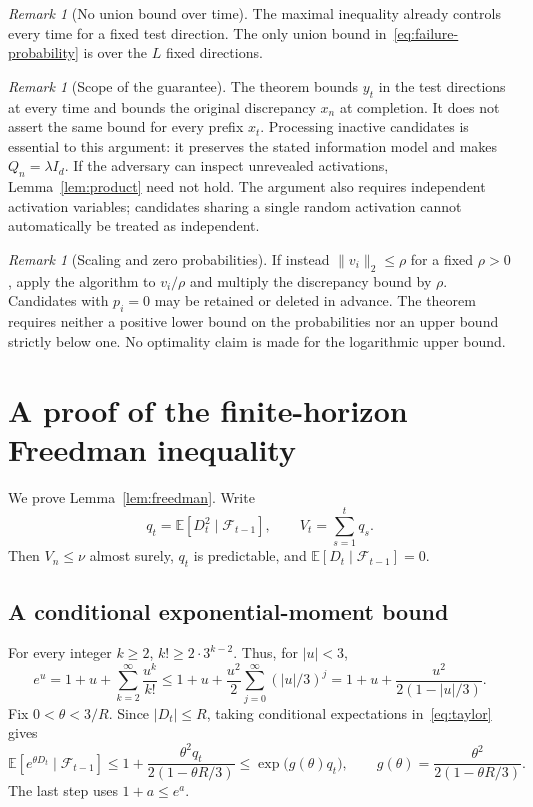 \documentclass[11pt,a4paper]{article}
\numberwithin{equation}{section}
\theoremstyle{remark}
\newtheorem{remark}[theorem]{Remark}
\newcommand{\E}{\mathbb E}
\newcommand{\F}{\mathcal F}
\begin{document}
\begin{remark}[No union bound over time]
The maximal inequality already controls every time for a fixed test
direction. The only union bound in~\eqref{eq:failure-probability} is
over the $L$ fixed directions.
\end{remark}

\begin{remark}[Scope of the guarantee]
The theorem bounds $y_t$ in the test directions at every time and bounds
the original discrepancy $x_n$ at completion. It does not assert the
same bound for every prefix $x_t$. Processing inactive candidates is
essential to this argument: it preserves the stated information model and makes
$Q_n=\lambda I_d$. If the adversary can inspect unrevealed activations,
Lemma~\ref{lem:product} need not hold. The argument also requires
independent activation variables; candidates sharing a single random
activation cannot automatically be treated as independent.
\end{remark}

\begin{remark}[Scaling and zero probabilities]
If instead $\|v_i\|_2\le\rho$ for a fixed $\rho>0$, apply the algorithm
to $v_i/\rho$ and multiply the discrepancy bound by $\rho$.
Candidates with $p_i=0$ may be retained or deleted in advance.
The theorem requires neither a positive lower bound on the probabilities
nor an upper bound strictly below one. No optimality claim is made for
the logarithmic upper bound.
\end{remark}

\clearpage
\appendix
\section{A proof of the finite-horizon Freedman inequality}
\label{app:freedman}

We prove Lemma~\ref{lem:freedman}. Write
\[
 q_t=\E[D_t^2\mid\F_{t-1}],\qquad V_t=\sum_{s=1}^t q_s.
\]
Then $V_n\le\nu$ almost surely, $q_t$ is predictable, and
$\E[D_t\mid\F_{t-1}]=0$.

\subsection{A conditional exponential-moment bound}

For every integer $k\ge2$, $k!\ge2\cdot3^{k-2}$. Thus, for $|u|<3$,
\begin{equation}\label{eq:taylor}
 e^u
 =1+u+\sum_{k=2}^{\infty}\frac{u^k}{k!}
 \le1+u+\frac{u^2}{2}\sum_{j=0}^{\infty}(|u|/3)^j
 =1+u+\frac{u^2}{2(1-|u|/3)}.
\end{equation}
Fix $0<\theta<3/R$. Since $|D_t|\le R$, taking conditional
expectations in~\eqref{eq:taylor} gives
\begin{equation}\label{eq:mgf}
 \E[e^{\theta D_t}\mid\F_{t-1}]
 \le1+\frac{\theta^2 q_t}{2(1-\theta R/3)}
 \le\exp\!\bigl(g(\theta)q_t\bigr),\qquad
 g(\theta)=\frac{\theta^2}{2(1-\theta R/3)}.
\end{equation}
The last step uses $1+a\le e^a$.
\end{document}
